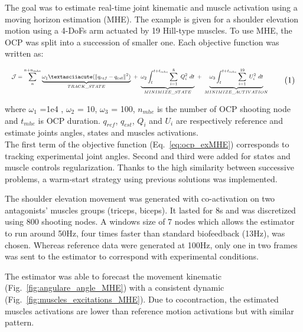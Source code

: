 The goal was to estimate real-time joint kinematic and muscle activation using a moving horizon estimation (MHE). The example is given for a shoulder elevation motion using a 4-DoFs arm actuated by 19 Hill-type muscles. To use MHE, the OCP was split into a succession of smaller one. Each objective function was written as:

\[
\resizebox{0.9\columnwidth}{!}{$
\begin{aligned} \noindent \mathcal{J} = \sum_{n}^{n + n_{mhe}}\underbrace{\omega_1´(\|q_{ref} - q_{est}\|^{2})}_{TRACK\_STATE} ~ + ~ \underbrace{\omega_2\int_t^{t+t_{mhe}} \sum_{i=1}^{8}~Q_{i}^2~dt}_{MINIMIZE\_ STATE} ~ + ~ \underbrace{\omega_3\int_t^{t+t_{mhe}} \sum_{i=1}^{19}~U_{i}^2~dt}_{MINIMIZE\_ ACTIVATION} 
\end{aligned}
$} \addtag \label{eq:ocp_exMHE} 
\]

\noindent where $\omega_1$ =1e4 , $\omega_2$ = 10, $\omega_3$ = 100, $n_{mhe}$ is the number of OCP shooting node and $t_{mhe}$ is OCP duration. $q_{ref}$, $q_{est}$, $Q_i$ and $U_i$ are respectively reference and estimate joints angles, states and muscles activations. \\  
The first term of the objective function (Eq.~\ref{eq:ocp_exMHE}) corresponds to tracking experimental joint angles. Second and third were added for states and muscle controls regularization. Thanks to the high similarity between successive problems, a warm-start strategy using previous solutions was implemented.  
 
 
The shoulder elevation movement was generated with co-activation on two antagonists' muscles groups (triceps, biceps). It lasted for 8s and was discretized using 800 shooting nodes. A windows size of 7 nodes which allows the estimator to run around 50Hz, four times faster than standard biofeedback (13Hz), was chosen. Whereas reference data were generated at 100Hz, only one in two frames was sent to the estimator to correspond with experimental conditions.
 
The estimator was able to forecast the movement kinematic (Fig.~\ref{fig:angulare_angle_MHE}) with a consistent dynamic (Fig.~\ref{fig:muscles_excitations_MHE}). Due to cocontraction, the estimated muscles activations are lower than reference motion activations but with similar pattern. 

